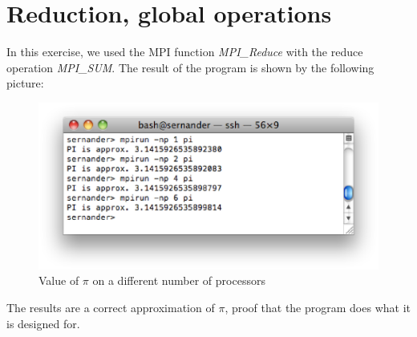 \chapter{Reduction, global operations}

In this exercise, we used the MPI function \textit{MPI\_Reduce} with the reduce operation \textit{MPI\_SUM}. The result of the program is shown by the following picture:
\begin{figure}[!h]
\begin{center}
	\includegraphics[width=\textwidth]{pic/pi.eps}
	\caption{Value of $\pi$ on a different number of processors}
\end{center}
\end{figure}

The results are a correct approximation of $\pi$, proof that the program does what it is designed for.

